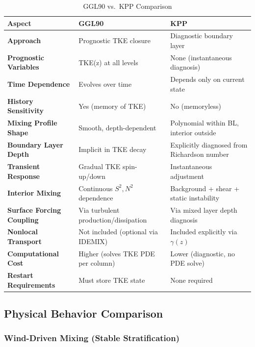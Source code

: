 \documentclass[11pt, a4paper]{article}
\begin{document}
\begin{table}[h]
\centering
\caption{GGL90 vs.\ KPP Comparison}
\begin{tabular}{lll}
\toprule
\textbf{Aspect} & \textbf{GGL90} & \textbf{KPP} \\
\midrule
\textbf{Approach} & Prognostic TKE closure & Diagnostic boundary layer \\
\textbf{Prognostic Variables} & TKE(z) at all levels & None (instantaneous diagnosis) \\
\textbf{Time Dependence} & Evolves over time & Depends only on current state \\
\textbf{History Sensitivity} & Yes (memory of TKE) & No (memoryless) \\
\textbf{Mixing Profile Shape} & Smooth, depth-dependent & Polynomial within BL, interior outside \\
\textbf{Boundary Layer Depth} & Implicit in TKE decay & Explicitly diagnosed from Richardson number \\
\textbf{Transient Response} & Gradual TKE spin-up/down & Instantaneous adjustment \\
\textbf{Interior Mixing} & Continuous $S^2, N^2$ dependence & Background + shear + static instability \\
\textbf{Surface Forcing Coupling} & Via turbulent production/dissipation & Via mixed layer depth diagnosis \\
\textbf{Nonlocal Transport} & Not included (optional via IDEMIX) & Included explicitly via $\gamma(z)$ \\
\textbf{Computational Cost} & Higher (solves TKE PDE per column) & Lower (diagnostic, no PDE solve) \\
\textbf{Restart Requirements} & Must store TKE state & None required \\
\end{tabular}
\end{table}

\subsection{Physical Behavior Comparison}

\subsubsection{Wind-Driven Mixing (Stable Stratification)}
\end{document}
